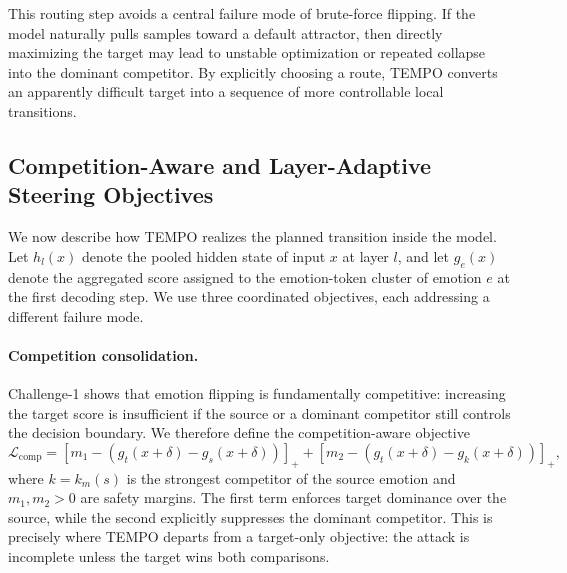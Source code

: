 This routing step avoids a central failure mode of brute-force flipping. If the model naturally pulls samples toward a default attractor, then directly maximizing the target may lead to unstable optimization or repeated collapse into the dominant competitor. By explicitly choosing a route, \textsc{TEMPO} converts an apparently difficult target into a sequence of more controllable local transitions.

\subsection{Competition-Aware and Layer-Adaptive Steering Objectives}
\label{subsec:tempo-objective}

We now describe how \textsc{TEMPO} realizes the planned transition inside the model. Let $h_l(x)$ denote the pooled hidden state of input $x$ at layer $l$, and let $g_e(x)$ denote the aggregated score assigned to the emotion-token cluster of emotion $e$ at the first decoding step. We use three coordinated objectives, each addressing a different failure mode.

\paragraph{Competition consolidation.}
Challenge-1 shows that emotion flipping is fundamentally competitive: increasing the target score is insufficient if the source or a dominant competitor still controls the decision boundary. We therefore define the competition-aware objective
\begin{equation}
\mathcal{L}_{\mathrm{comp}}
=
\left[m_1 - (g_t(x+\delta)-g_s(x+\delta))\right]_+
+
\left[m_2 - (g_t(x+\delta)-g_k(x+\delta))\right]_+,
\label{eq:tempo-comp}
\end{equation}
where $k = k_m(s)$ is the strongest competitor of the source emotion and $m_1,m_2>0$ are safety margins. The first term enforces target dominance over the source, while the second explicitly suppresses the dominant competitor. This is precisely where \textsc{TEMPO} departs from a target-only objective: the attack is incomplete unless the target wins both comparisons.

